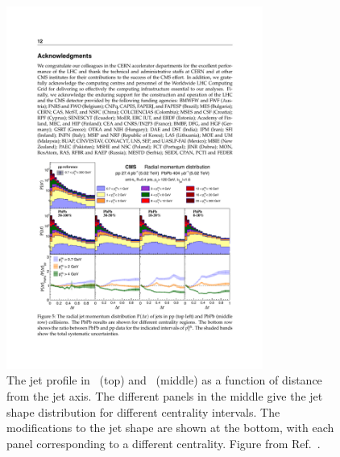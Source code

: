\begin{figure}[htbp]
\begin{center}
\includegraphics[width=0.75\textwidth]{figures/jetMeasurements/jetshape_cms}
\caption{The jet profile in \pp\ (top) and \pbpb\ (middle) as a function of distance from the jet axis.
The different panels in the middle give the jet shape distribution for different centrality intervals.
The modifications to the jet shape are shown at the bottom, with each panel corresponding to a different centrality.
Figure from Ref.~\cite{Sirunyan:2018jqr}.}
\label{fig:jetshape_cms}
\end{center}
\end{figure}
